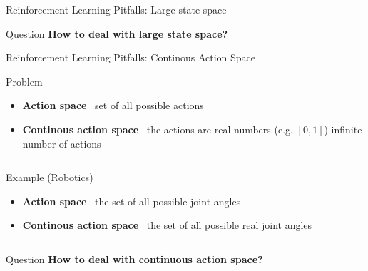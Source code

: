 \documentclass[presentation, 9pt]{beamer}\mode<presentation>{\usetheme{AMSBolognaFC}}
\begin{document}
\begin{frame}{Reinforcement Learning Pitfalls: Large state space}
\begin{alertblock}{Question}
	\centering
	\textbf{How to deal with large state space?}
\end{alertblock}
\end{frame}

\begin{frame}{Reinforcement Learning Pitfalls: Continous Action Space}
	\begin{block}{Problem}
		\begin{itemize}
			\item \textbf{Action space} \faArrowRight \, set of all possible actions
			\item \textbf{Continous action space} \faArrowRight \, the actions are real numbers (e.g. $[0,1]$) \faArrowRight infinite number of actions
		\end{itemize}
	\end{block}
	\begin{columns}
		\begin{column}{0.5\textwidth}
			\begin{block}{Example (Robotics) \, \href{}{\faLink}}
				\begin{itemize}
					\item \textbf{Action space} \faArrowRight \, the set of all possible joint angles
					\item \textbf{Continous action space} \faArrowRight \, the set of all possible real joint angles
				\end{itemize}
			\end{block}
		\end{column}
		\begin{column}{0.5\textwidth}
			\centering
		\end{column}
	\end{columns}
	
	\begin{alertblock}{Question}
		\centering
		\textbf{How to deal with continuous action space?}
	\end{alertblock}
\end{frame}
\end{document}
